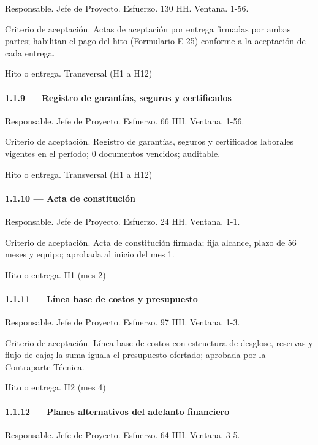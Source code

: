 \documentclass[11pt]{article}
\begin{document}
Responsable. Jefe de Proyecto. Esfuerzo. 130 HH. Ventana. 1-56.

Criterio de aceptación. Actas de aceptación por entrega firmadas por ambas partes; habilitan el pago del hito (Formulario E-25) conforme a la aceptación de cada entrega.

Hito o entrega. Transversal (H1 a H12)

\paragraph{1.1.9 — Registro de garantías, seguros y certificados}

Responsable. Jefe de Proyecto. Esfuerzo. 66 HH. Ventana. 1-56.

Criterio de aceptación. Registro de garantías, seguros y certificados laborales vigentes en el período; 0 documentos vencidos; auditable.

Hito o entrega. Transversal (H1 a H12)

\paragraph{1.1.10 — Acta de constitución}

Responsable. Jefe de Proyecto. Esfuerzo. 24 HH. Ventana. 1-1.

Criterio de aceptación. Acta de constitución firmada; fija alcance, plazo de 56 meses y equipo; aprobada al inicio del mes 1.

Hito o entrega. H1 (mes 2)

\paragraph{1.1.11 — Línea base de costos y presupuesto}

Responsable. Jefe de Proyecto. Esfuerzo. 97 HH. Ventana. 1-3.

Criterio de aceptación. Línea base de costos con estructura de desglose, reservas y flujo de caja; la suma iguala el presupuesto ofertado; aprobada por la Contraparte Técnica.

Hito o entrega. H2 (mes 4)

\paragraph{1.1.12 — Planes alternativos del adelanto financiero}

Responsable. Jefe de Proyecto. Esfuerzo. 64 HH. Ventana. 3-5.
\end{document}
